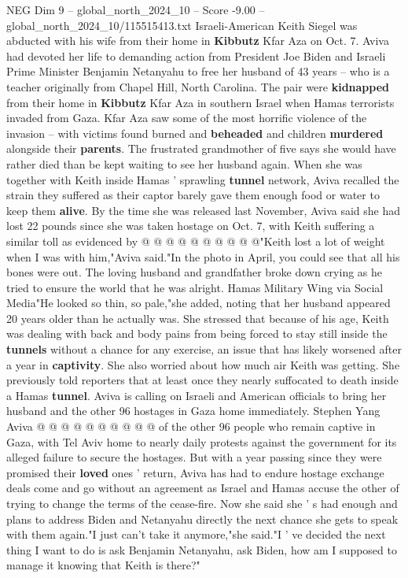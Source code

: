 \begin{textsample}{NEG Dim 9 – global\_north\_2024\_10 – Score -9.00 – global\_north\_2024\_10/115515413.txt}  \label{ex:f9_neg_046}
Israeli-American Keith Siegel was abducted with his wife from their home in \textbf{Kibbutz} Kfar Aza on Oct. 7.
Aviva had devoted her life to demanding action from President Joe Biden and Israeli Prime Minister Benjamin Netanyahu to free her husband of 43 years -- who is a teacher originally from Chapel Hill, North Carolina.
The pair were \textbf{kidnapped} from their home in \textbf{Kibbutz} Kfar Aza in southern Israel when Hamas terrorists invaded from Gaza.
Kfar Aza saw some of the most horrific violence of the invasion -- with victims found burned and \textbf{beheaded} and children \textbf{murdered} alongside their \textbf{parents}.
The frustrated grandmother of five says she would have rather died than be kept waiting to see her husband again.
When she was together with Keith inside Hamas ' sprawling \textbf{tunnel} network, Aviva recalled the strain they suffered as their captor barely gave them enough food or water to keep them \textbf{alive}.
By the time she was released last November, Aviva said she had lost 22 pounds since she was taken hostage on Oct. 7, with Keith suffering a similar toll as evidenced by @ @ @ @ @ @ @ @ @ @"Keith lost a lot of weight when I was with him,"Aviva said."In the photo in April, you could see that all his bones were out.
The loving husband and grandfather broke down crying as he tried to ensure the world that he was alright.
Hamas Military Wing via Social Media"He looked so thin, so pale,"she added, noting that her husband appeared 20 years older than he actually was.
She stressed that because of his age, Keith was dealing with back and body pains from being forced to stay still inside the \textbf{tunnels} without a chance for any exercise, an issue that has likely worsened after a year in \textbf{captivity}.
She also worried about how much air Keith was getting.
She previously told reporters that at least once they nearly suffocated to death inside a Hamas \textbf{tunnel}.
Aviva is calling on Israeli and American officials to bring her husband and the other 96 hostages in Gaza home immediately.
Stephen Yang Aviva @ @ @ @ @ @ @ @ @ @ of the other 96 people who remain captive in Gaza, with Tel Aviv home to nearly daily protests against the government for its alleged failure to secure the hostages.
But with a year passing since they were promised their \textbf{loved} ones ' return, Aviva has had to endure hostage exchange deals come and go without an agreement as Israel and Hamas accuse the other of trying to change the terms of the cease-fire.
Now she said she ' s had enough and plans to address Biden and Netanyahu directly the next chance she gets to speak with them again."I just can't take it anymore,"she said."I ' ve decided the next thing I want to do is ask Benjamin Netanyahu, ask Biden, how am I supposed to manage it knowing that Keith is there?"

\end{textsample}
